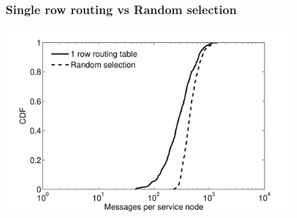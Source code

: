 \documentclass[xcolor=pdftex,dvipsnames,table]{beamer}
\begin{document}
\begin{frame}
    \frametitle{Single row routing vs Random selection}
    \includegraphics[width=10.75cm]{diagrams/RandomNodeStressLog}
\end{frame}
\end{document}
